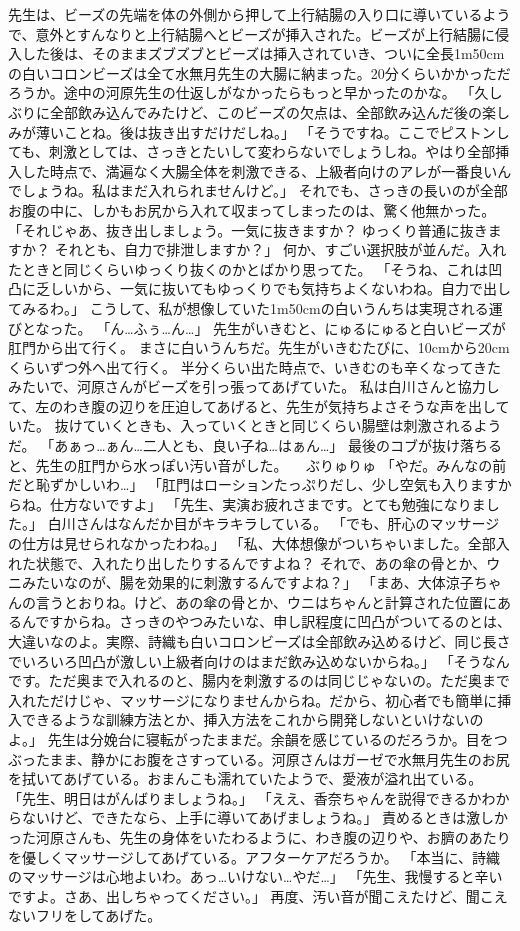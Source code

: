 先生は、ビーズの先端を体の外側から押して上行結腸の入り口に導いているようで、意外とすんなりと上行結腸へとビーズが挿入された。ビーズが上行結腸に侵入した後は、そのままズブズブとビーズは挿入されていき、ついに全長1m50cmの白いコロンビーズは全て水無月先生の大腸に納まった。20分くらいかかっただろうか。途中の河原先生の仕返しがなかったらもっと早かったのかな。
「久しぶりに全部飲み込んでみたけど、このビーズの欠点は、全部飲み込んだ後の楽しみが薄いことね。後は抜き出すだけだしね。」
「そうですね。ここでピストンしても、刺激としては、さっきとたいして変わらないでしょうしね。やはり全部挿入した時点で、満遍なく大腸全体を刺激できる、上級者向けのアレが一番良いんでしょうね。私はまだ入れられませんけど。」
それでも、さっきの長いのが全部お腹の中に、しかもお尻から入れて収まってしまったのは、驚く他無かった。
「それじゃあ、抜き出しましょう。一気に抜きますか？ ゆっくり普通に抜きますか？ それとも、自力で排泄しますか？」
何か、すごい選択肢が並んだ。入れたときと同じくらいゆっくり抜くのかとばかり思ってた。
「そうね、これは凹凸に乏しいから、一気に抜いてもゆっくりでも気持ちよくないわね。自力で出してみるわ。」
こうして、私が想像していた1m50cmの白いうんちは実現される運びとなった。
「ん…ふぅ…ん…」
先生がいきむと、にゅるにゅると白いビーズが肛門から出て行く。
まさに白いうんちだ。先生がいきむたびに、10cmから20cmくらいずつ外へ出て行く。
半分くらい出た時点で、いきむのも辛くなってきたみたいで、河原さんがビーズを引っ張ってあげていた。
私は白川さんと協力して、左のわき腹の辺りを圧迫してあげると、先生が気持ちよさそうな声を出していた。
抜けていくときも、入っていくときと同じくらい腸壁は刺激されるようだ。
「あぁっ…ぁん…二人とも、良い子ね…はぁん…」
最後のコブが抜け落ちると、先生の肛門から水っぽい汚い音がした。
　ぶりゅりゅ
「やだ。みんなの前だと恥ずかしいわ…」
「肛門はローションたっぷりだし、少し空気も入りますからね。仕方ないですよ」
「先生、実演お疲れさまです。とても勉強になりました。」
白川さんはなんだか目がキラキラしている。
「でも、肝心のマッサージの仕方は見せられなかったわね。」
「私、大体想像がついちゃいました。全部入れた状態で、入れたり出したりするんですよね？ それで、あの傘の骨とか、ウニみたいなのが、腸を効果的に刺激するんですよね？」
「まあ、大体涼子ちゃんの言うとおりね。けど、あの傘の骨とか、ウニはちゃんと計算された位置にあるんですからね。さっきのやつみたいな、申し訳程度に凹凸がついてるのとは、大違いなのよ。実際、詩織も白いコロンビーズは全部飲み込めるけど、同じ長さでいろいろ凹凸が激しい上級者向けのはまだ飲み込めないからね。」
「そうなんです。ただ奥まで入れるのと、腸内を刺激するのは同じじゃないの。ただ奥まで入れただけじゃ、マッサージになりませんからね。だから、初心者でも簡単に挿入できるような訓練方法とか、挿入方法をこれから開発しないといけないのよ。」
先生は分娩台に寝転がったままだ。余韻を感じているのだろうか。目をつぶったまま、静かにお腹をさすっている。河原さんはガーゼで水無月先生のお尻を拭いてあげている。おまんこも濡れていたようで、愛液が溢れ出ている。
「先生、明日はがんばりましょうね。」
「ええ、香奈ちゃんを説得できるかわからないけど、できたなら、上手に導いてあげましょうね。」
責めるときは激しかった河原さんも、先生の身体をいたわるように、わき腹の辺りや、お臍のあたりを優しくマッサージしてあげている。アフターケアだろうか。
「本当に、詩織のマッサージは心地よいわ。あっ…いけない…やだ…」
「先生、我慢すると辛いですよ。さあ、出しちゃってください。」
再度、汚い音が聞こえたけど、聞こえないフリをしてあげた。


